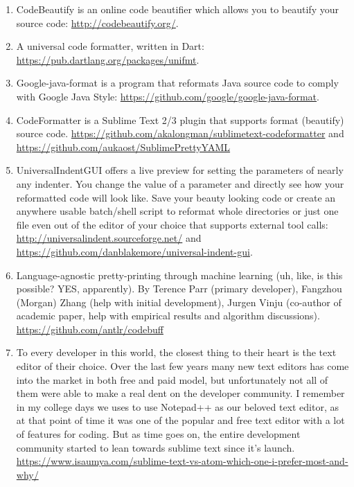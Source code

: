 \begin{englishtext}
\begin{sloppypar}
\begin{bluebox}\RaggedRight
\begin{enumerate}[leftmargin=*,parsep=0pt]

    \item CodeBeautify is an online code beautifier which allows you to beautify
    your source code: \url{http://codebeautify.org/}.

    \item A universal code formatter, written in Dart:
    \url{https://pub.dartlang.org/packages/unifmt}.

    \item Google-java-format is a program that reformats Java source code to
    comply with Google Java Style:
    \url{https://github.com/google/google-java-format}.

    \item CodeFormatter is a Sublime Text 2/3 plugin that supports format
    (beautify) source code.
    \url{https://github.com/akalongman/sublimetext-codeformatter} and
    \url{https://github.com/aukaost/SublimePrettyYAML}

    \item UniversalIndentGUI offers a live preview for setting the parameters of
    nearly any indenter. You change the value of a parameter and directly see
    how your reformatted code will look like. Save your beauty looking code or
    create an anywhere usable batch/shell script to reformat whole directories
    or just one file even out of the editor of your choice that supports
    external tool calls: \url{http://universalindent.sourceforge.net/} and
    \url{https://github.com/danblakemore/universal-indent-gui}.

    \item Language-agnostic pretty-printing through machine learning (uh, like,
    is this possible? YES, apparently). By Terence Parr (primary developer),
    Fangzhou (Morgan) Zhang (help with initial development), Jurgen Vinju
    (co-author of academic paper, help with empirical results and algorithm
    discussions). \url{https://github.com/antlr/codebuff}

    \item To every developer in this world, the closest thing to their heart is
    the text editor of their choice. Over the last few years many new text
    editors has come into the market in both free and paid model, but
    unfortunately not all of them were able to make a real dent on the developer
    community. I remember in my college days we uses to use Notepad++ as our
    beloved text editor, as at that point of time it was one of the popular and
    free text editor with a lot of features for coding. But as time goes on, the
    entire development community started to lean towards sublime text since it’s
    launch.
    \url{https://www.isaumya.com/sublime-text-vs-atom-which-one-i-prefer-most-and-why/}


\end{enumerate}
\end{bluebox}
\end{sloppypar}
\end{englishtext}

